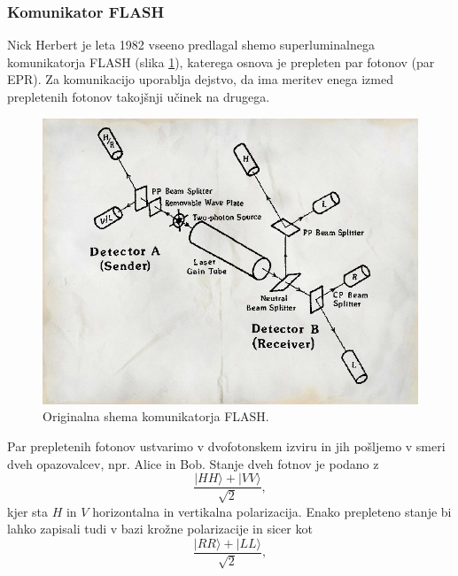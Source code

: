 \documentclass[12pt]{article}
\begin{document}
\subsubsection{Komunikator FLASH}

\par Nick Herbert je leta 1982 vseeno predlagal shemo superluminalnega komunikatorja FLASH (slika \ref{fig:flash}), katerega osnova je prepleten par fotonov (par EPR). Za komunikacijo uporablja dejstvo, da ima meritev enega izmed prepletenih fotonov takojšnji učinek na drugega.

\begin{figure}[h]
\includegraphics[width=12cm]{flash.jpg}
\centering
\caption{Originalna shema komunikatorja FLASH. \cite{herbertFLASHSuperluminalCommunicator1982}}
\label{fig:flash}
\end{figure}
\par Par prepletenih fotonov ustvarimo v dvofotonskem izviru in jih pošljemo v smeri dveh opazovalcev, npr. Alice in Bob. Stanje dveh fotnov je podano z
\begin{equation}
\frac{| HH \rangle + | VV \rangle}{\sqrt{2}},
\end{equation}
kjer sta $H$ in $V$ horizontalna in vertikalna polarizacija. Enako prepleteno stanje bi lahko zapisali tudi v bazi krožne polarizacije in sicer kot
\begin{equation}
\frac{| RR \rangle + | LL \rangle}{\sqrt{2}},
\end{equation}
\end{document}
